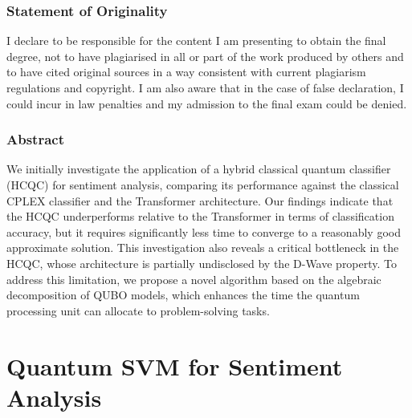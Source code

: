 \documentclass[11pt, oneside]{book}
\begin{document}

\newpage

\vfill
\section*{Statement of Originality}
I declare to be responsible for the content I am presenting to obtain the final degree, not to have plagiarised in all or part of the work produced by others and to have cited original sources in a way consistent with current plagiarism regulations and copyright. I am also aware that in the case of false declaration, I could incur in law penalties and my admission to the final exam could be denied.
\newpage



\newpage

\section*{Abstract}
We initially investigate the application of a hybrid classical quantum classifier (HCQC) for sentiment analysis, comparing its performance against the classical CPLEX classifier and the Transformer architecture. 
Our findings indicate that the HCQC underperforms relative to the Transformer in terms of classification accuracy, but it requires significantly less time to converge to a reasonably good approximate solution. 
This investigation also reveals a critical bottleneck in the HCQC, whose architecture is partially undisclosed by the D-Wave property. 
To address this limitation, we propose a novel algorithm based on the algebraic decomposition of QUBO models, which enhances the time the quantum processing unit can allocate to problem-solving tasks.

\newpage

\tableofcontents
\newpage





\part{Quantum SVM for Sentiment Analysis}








\end{document}
